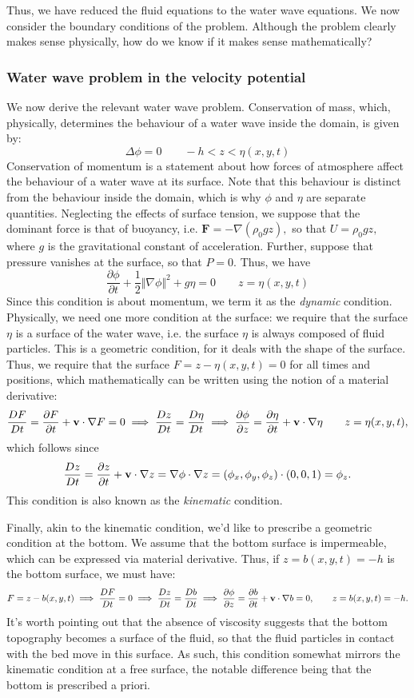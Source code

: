 \documentclass[10pt,reqno,oneside,a4paper]{article}
\begin{document}
Thus, we have reduced the fluid equations to the water wave equations. We now consider the boundary conditions of the problem. Although the problem clearly makes sense physically, how do we know if it makes sense mathematically?

\subsubsection{Water wave problem in the velocity potential}
We now derive the relevant water wave problem. Conservation of mass, which, physically, determines the behaviour of a water wave inside the domain, is given by:
\[
\Delta \phi = 0 \qquad -h <z < \eta(x,y,t)
\]
Conservation of momentum is a statement about how forces of atmosphere affect the behaviour of a water wave at its surface. Note that this behaviour is distinct from the behaviour inside the domain, which is why $\phi$ and $\eta$ are separate quantities. Neglecting the effects of surface tension, we suppose that the dominant force is that of buoyancy, i.e. $\textbf{F} = - \nabla(\rho_0 gz),$ so that $U = \rho_0 g z,$ where $g$ is the gravitational constant of acceleration. Further, suppose that pressure vanishes at the surface, so that $P = 0.$ Thus, we have 
\[ 
\frac{\partial \phi}{\partial t} + \frac{1}{2} \Vert \nabla \phi \Vert^2 + g \eta = 0 \qquad z = \eta(x,y,t)
\]
Since this condition is about momentum, we term it as the \textit{dynamic} condition. 
Physically, we need one more condition at the surface: we require that the surface $\eta$ is a surface of the water wave, i.e. the surface $\eta$ is always composed of fluid particles. This is a geometric condition, for it deals with the shape of the surface. Thus, we require that the surface $F = z - \eta(x,y,t) = 0 $ for all times and positions, which mathematically can be written using the notion of a material derivative:
\[ 
\frac{DF}{Dt} = \frac{\partial F}{\partial t} + {\bf v} \cdot \nabla F = 0 \implies \frac{Dz}{Dt} = \frac{D\eta}{Dt}  \implies \frac{\partial \phi}{\partial z} =  \frac{\partial \eta}{\partial t} + {\bf v} \cdot \nabla \eta \qquad z = \eta(x,y,t),
\]
which follows since \[ \dfrac{Dz}{Dt} = \dfrac{\partial z}{\partial t} + {\bf v} \cdot \nabla z = \nabla \phi \cdot \nabla z = (\phi_x, \phi_y, \phi_z) \cdot (0,0,1) = \phi_z. \]
This condition is also known as the \textit{kinematic} condition. 

Finally, akin to the kinematic condition, we'd like to prescribe a geometric condition at the bottom. We assume that the bottom surface is impermeable, which can be expressed via material derivative. Thus, if $z = b(x,y,t) = -h$ is the bottom surface, we must have:
\[ 
F = z - b(x,y,t) \implies \frac{DF}{Dt} = 0 \implies \frac{Dz}{Dt} = \frac{D b}{Dt} \implies \frac{\partial \phi}{\partial z} = \frac{\partial b}{\partial t} + {\bf v} \cdot \nabla b = 0, \qquad z = b(x,y,t)= - h.
\]
It's worth pointing out that the absence of viscosity suggests that the bottom topography becomes a surface of the fluid, so that the fluid particles in contact with the bed move in this surface. As such, this condition somewhat mirrors the kinematic condition at a free surface, the notable difference being that the bottom is prescribed a priori. 
\end{document}
